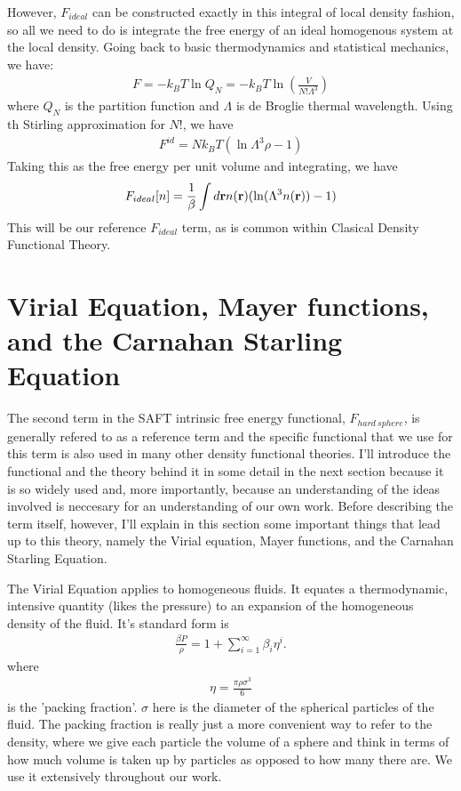 However, $F_{ideal}$ can be constructed exactly in this integral of
local density fashion, so all we need to do is integrate the free
energy of an ideal homogenous system at the local density.  Going back
to basic thermodynamics and statistical mechanics, we have:
\begin{align}
  F = -k_BT \ln Q_N = -k_BT \ln (\frac{V}{N!\Lambda^3})
\end{align}
where $Q_N$ is the partition function and $\Lambda$ is de Broglie
thermal wavelength.  Using th Stirling approximation for $N!$, we have
\begin{align}
F^{id} = Nk_BT(\ln \Lambda^3 \rho - 1)
\end{align}
Taking this as the free energy per unit volume and integrating, we
have
\begin{align}
  F_{ideal}[n] = \frac{1}{\beta}\int d\textbf{r} n(\textbf{r})(\ln (\Lambda^3 n(\textbf{r}))-1)
\end{align}
This will be our reference $F_{ideal}$ term, as is common within
Clasical Density Functional Theory.

\clearpage
\newpage

\section{Virial Equation, Mayer functions, and the Carnahan Starling Equation}

The second term in the SAFT intrinsic free energy functional,
$F_{hard~sphere}$, is generally refered to as a reference term and the
specific functional that we use for this term is also used in many
other density functional theories.  I'll introduce the functional and
the theory behind it in some detail in the next section because it is
so widely used and, more importantly, because an understanding of the
ideas involved is neccesary for an understanding of our own work.
Before describing the term itself, however, I'll explain in this
section some important things that lead up to this theory, namely the
Virial equation, Mayer functions, and the Carnahan Starling Equation.

The Virial Equation applies to homogeneous fluids.  It equates a
thermodynamic, intensive quantity (likes the pressure) to an expansion
of the homogeneous density of the fluid.  It's standard form is
\begin{align}
  \label{eq:virial-expansion}
  \frac{\beta P}{\rho} = 1 + \sum_{i=1}^{\infty}\beta_i\eta^i.
\end{align}
where
\begin{align}
  \eta = \frac{\pi \rho \sigma^3}{6}
\end{align}
is the 'packing fraction'.  $\sigma$ here is the diameter of the
spherical particles of the fluid.  The packing fraction is really just
a more convenient way to refer to the density, where we give each
particle the volume of a sphere and think in terms of how much volume
is taken up by particles as opposed to how many there are.  We use it
extensively throughout our work.

